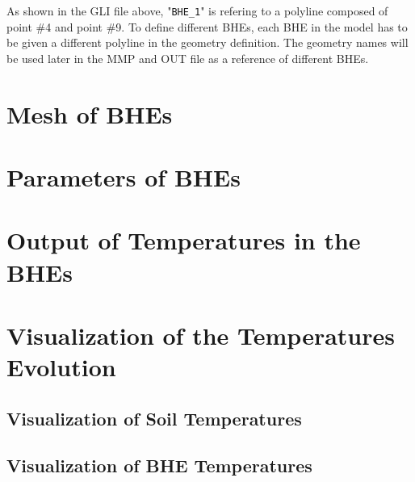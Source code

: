 As shown in the GLI file above,  "\texttt{BHE\_1}" is refering to a polyline composed of point \#4 and point \#9. To define different BHEs, each BHE in the model has to be given a different polyline in the geometry definition. The geometry names will be used later in the MMP and OUT file as a reference of different BHEs. 

\section{Mesh of BHEs}



\section{Parameters of BHEs}



\section{Output of Temperatures in the BHEs}
\label{sec:temp_output}


\section{Visualization of the Temperatures Evolution}

\subsection{Visualization of Soil Temperatures}

\subsection{Visualization of BHE Temperatures}


